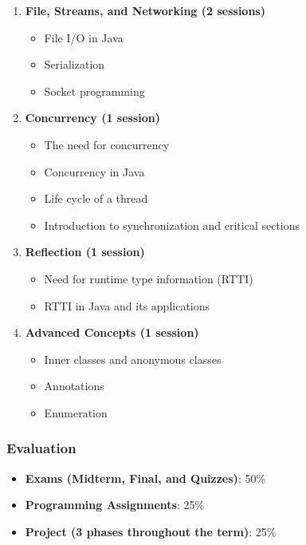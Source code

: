\documentclass[12pt]{article}
\begin{document}
\begin{enumerate}
    \item \textbf{File, Streams, and Networking (2 sessions)}
        \begin{itemize}
            \item File I/O in Java
            \item Serialization
            \item Socket programming
        \end{itemize}
    
    \item \textbf{Concurrency (1 session)}
        \begin{itemize}
            \item The need for concurrency
            \item Concurrency in Java
            \item Life cycle of a thread
            \item Introduction to synchronization and critical sections
        \end{itemize}
    
    \item \textbf{Reflection (1 session)}
        \begin{itemize}
            \item Need for runtime type information (RTTI)
            \item RTTI in Java and its applications
        \end{itemize}
    
    \item \textbf{Advanced Concepts (1 session)}
        \begin{itemize}
            \item Inner classes and anonymous classes
            \item Annotations
            \item Enumeration
        \end{itemize}
\end{enumerate}

\subsubsection*{Evaluation}
\begin{itemize}
    \item \textbf{Exams (Midterm, Final, and Quizzes)}: 50\%
    \item \textbf{Programming Assignments}: 25\%
    \item \textbf{Project (3 phases throughout the term)}: 25\%
\end{itemize}
\end{document}

